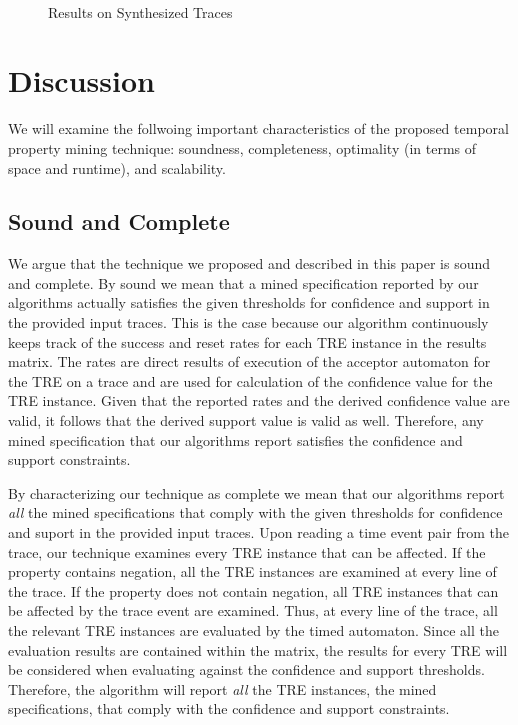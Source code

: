 \documentclass[]{sigplanconf}
\begin{document}
\begin{figure}
  \centering
  \\
  \caption{Results on Synthesized Traces}
\end{figure}


\section{Discussion} \label{discussion}

We will examine the follwoing important characteristics of the proposed temporal property mining technique: soundness, completeness, optimality (in terms of space and runtime), and scalability.


\subsection{Sound and Complete}

We argue that the technique we proposed and described in this paper is sound and complete. By sound we mean that a mined specification reported by our algorithms actually satisfies the given thresholds for confidence and support in the provided input traces. This is the case because our algorithm continuously keeps track of the success and reset rates for each TRE instance in the results matrix. The rates are direct results of execution of the acceptor automaton for the TRE on a trace and are used for calculation of the confidence value for the TRE instance. Given that the reported rates and the derived confidence value are valid, it follows that the derived support value is valid as well. Therefore, any mined specification that our algorithms report satisfies the confidence and support constraints.

By characterizing our technique as complete we mean that our algorithms report \emph{all} the mined specifications that comply with the given thresholds for confidence and suport in the provided input traces. Upon reading a time event pair from the trace, our technique examines every TRE instance that can be affected. If the property contains negation, all the TRE instances are examined at every line of the trace. If the property does not contain negation, all TRE instances that can be affected by the trace event are examined. Thus, at every line of the trace, all the relevant TRE instances are evaluated by the timed automaton. Since all the evaluation results are contained within the matrix, the results for every TRE will be considered when evaluating against the confidence and support thresholds. Therefore, the algorithm will report \emph{all} the TRE instances, the mined specifications, that comply with the confidence and support constraints.
\end{document}
